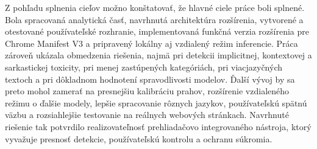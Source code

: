 Z pohľadu splnenia cieľov možno konštatovať, že hlavné ciele práce boli splnené. Bola spracovaná analytická časť, navrhnutá architektúra rozšírenia, vytvorené a otestované používateľské rozhranie, implementovaná funkčná verzia rozšírenia pre Chrome Manifest V3 a pripravený lokálny aj vzdialený režim inferencie. Práca zároveň ukázala obmedzenia riešenia, najmä pri detekcii implicitnej, kontextovej a sarkastickej toxicity, pri menej zastúpených kategóriách, pri viacjazyčných textoch a pri dôkladnom hodnotení spravodlivosti modelov. Ďalší vývoj by sa preto mohol zamerať na presnejšiu kalibráciu prahov, rozšírenie vzdialeného režimu o ďalšie modely, lepšie spracovanie rôznych jazykov, používateľskú spätnú väzbu a rozsiahlejšie testovanie na reálnych webových stránkach. Navrhnuté riešenie tak potvrdilo realizovateľnosť prehliadačovo integrovaného nástroja, ktorý vyvažuje presnosť detekcie, používateľskú kontrolu a ochranu súkromia.